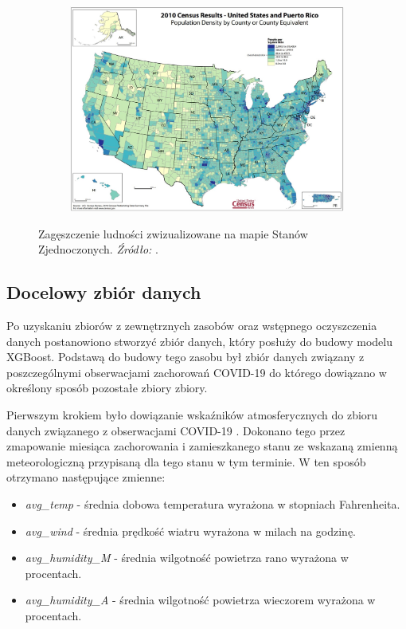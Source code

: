 \documentclass[polish, twoside, 12pt, a4paper]{article}
\theoremstyle{definition}
\theoremstyle{plain}
\theoremstyle{remark}
\begin{document}
\begin{figure}[H]
  \centering
  \begin{subfigure}[t]{\textwidth}
    \includegraphics[width=15cm]{us-desity.jpg}
  \end{subfigure}
  \captionsetup{margin=10pt,font=small,labelfont=bf,width=.8\textwidth}
  \caption{Zagęszczenie ludności zwizualizowane na mapie Stanów Zjednoczonych. \textit{Źródło:} \cite{USCB2021}.}\label{fig:figure:xx5}
\end{figure}

\subsection{Docelowy zbiór danych}

Po uzyskaniu zbiorów z zewnętrznych zasobów oraz wstępnego oczyszczenia danych postanowiono stworzyć zbiór danych, który posłuży do budowy modelu XGBoost. Podstawą do budowy tego zasobu był zbiór danych związany z poszczególnymi obserwacjami zachorowań COVID-19 do którego dowiązano w określony sposób pozostałe zbiory zbiory.

Pierwszym krokiem było dowiązanie wskaźników atmosferycznych do zbioru danych związanego z obserwacjami COVID-19 . Dokonano tego przez zmapowanie miesiąca zachorowania i zamieszkanego stanu ze wskazaną zmienną meteorologiczną przypisaną dla tego stanu w tym terminie. W ten sposób otrzymano następujące zmienne:
\begin{itemize}
  \item \emph{avg\_temp} - średnia dobowa temperatura wyrażona w stopniach Fahrenheita.
  \item \emph{avg\_wind} - średnia prędkość wiatru wyrażona w milach na godzinę.
  \item \emph{avg\_humidity\_M} - średnia wilgotność powietrza rano wyrażona w procentach.
  \item \emph{avg\_humidity\_A} - średnia wilgotność powietrza wieczorem wyrażona w procentach.
\end{itemize}
\end{document}
